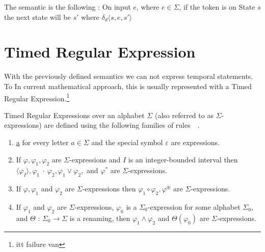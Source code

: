 			The semantic is the following : 
			On input $e$, where $e \in \Sigma$, if the token is on State $s$ the next state will be $s'$ where %
			$\delta_d \langle s,e,s' \rangle$ 
			
	\section{Timed Regular Expression}
		With the previously defined semantics we can not express temporal statements.
		To In current mathematical approach, this is usually represented with a Timed Regular Expression.\footnote{itt failure van}

		\begin{dfn}
			\label{dfn:cep:tre}
			Timed Regular Expressions over an alphabet $\Sigma$ (also referred to as $\Sigma$-expressions)
			are defined using the following families of rules~\citep{tre}~.
			\begin{enumerate}
				\item \underline{a} for every letter $a \in \Sigma$ and the special symbol $\varepsilon$ are expressions.
				\item If $\varphi, \varphi_1, \varphi_2$ are $\Sigma$-expressions and $I$ is an integer-bounded interval then
					$\langle\varphi_I\rangle, \varphi_1~\cdot~\varphi_2, \varphi_1 \vee \varphi_2,$ and $\varphi^\ast$ are $\Sigma$-expressions.
				\item If $\varphi, \varphi_1$ and $\varphi_2$ are $\Sigma$-expressions then $\varphi_1 \circ \varphi_2, \varphi^\circledast$ are
					$\Sigma$-expressions.
				\item If $\varphi_1$ and $\varphi_2$ are $\Sigma$-expressions, $\varphi_0$ is a $\Sigma_0$-expression
					for some alphabet $\Sigma_0$, and $\Theta$ : $\Sigma_0 \rightarrow \Sigma$ is
					a renaming, then $\varphi_1 \wedge \varphi_2$ and $\Theta(\varphi_0)$ are $\Sigma$-expressions.
			\end{enumerate}
		\end{dfn}
		
